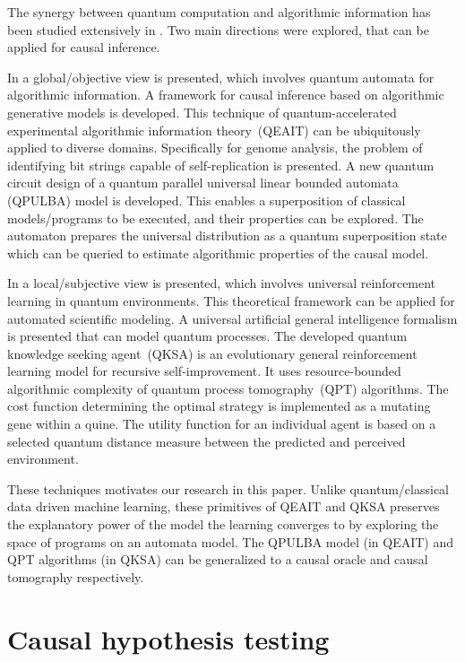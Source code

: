 \documentclass[
 aps,
 jmp,
 amsmath,amssymb,
 reprint,
]{revtex4-2}
\begin{document}
The synergy between quantum computation and algorithmic information has been studied extensively in \cite{sarkar2022applications}.
Two main directions were explored, that can be applied for causal inference.

In \cite{sarkar2021estimating} a global/objective view is presented, which involves quantum automata for algorithmic information.
A framework for causal inference based on algorithmic generative models is developed. 
This technique of quantum-accelerated experimental algorithmic information theory~(QEAIT) can be ubiquitously applied to diverse domains. 
Specifically for genome analysis, the problem of identifying bit strings capable of self-replication is presented. 
A new quantum circuit design of a quantum parallel universal linear bounded automata (QPULBA) model is developed.
This enables a superposition of classical models/programs to be executed, and their properties can be explored. 
The automaton prepares the universal distribution as a quantum superposition state which can be queried to estimate algorithmic properties of the causal model.

In \cite{sarkar2021qksa} a local/subjective view is presented, which involves universal reinforcement learning in quantum environments.
This theoretical framework can be applied for automated scientific modeling. 
A universal artificial general intelligence formalism is presented that can model quantum processes. 
The developed quantum knowledge seeking agent~(QKSA) is an evolutionary general reinforcement learning model for recursive self-improvement. 
It uses resource-bounded algorithmic complexity of quantum process tomography~(QPT) algorithms. 
The cost function determining the optimal strategy is implemented as a mutating gene within a quine. 
The utility function for an individual agent is based on a selected quantum distance measure between the predicted and perceived environment.

These techniques motivates our research in this paper.
Unlike quantum/classical data driven machine learning, these primitives of QEAIT and QKSA preserves the explanatory power of the model the learning converges to by exploring the space of programs on an automata model.
The QPULBA model (in QEAIT) and QPT algorithms (in QKSA) can be generalized to a causal oracle and causal tomography respectively.

\section{Causal hypothesis testing} \label{sec:causal-hypothesis-testing}
\end{document}
